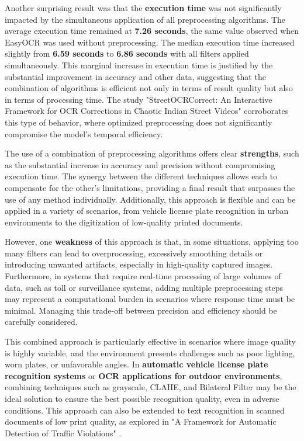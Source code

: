 \documentclass[conference]{IEEEtran}
\begin{document}
	Another surprising result was that the \textbf{execution time} was not significantly impacted by the simultaneous application of all preprocessing algorithms. The average execution time remained at \textbf{7.26 seconds}, the same value observed when EasyOCR was used without preprocessing. The median execution time increased slightly from \textbf{6.59 seconds} to \textbf{6.86 seconds} with all filters applied simultaneously. This marginal increase in execution time is justified by the substantial improvement in accuracy and other data, suggesting that the combination of algorithms is efficient not only in terms of result quality but also in terms of processing time. The study "StreetOCRCorrect: An Interactive Framework for OCR Corrections in Chaotic Indian Street Videos" \cite{b13} corroborates this type of behavior, where optimized preprocessing does not significantly compromise the model's temporal efficiency.
	
	The use of a combination of preprocessing algorithms offers clear \textbf{strengths}, such as the substantial increase in accuracy and precision without compromising execution time. The synergy between the different techniques allows each to compensate for the other's limitations, providing a final result that surpasses the use of any method individually. Additionally, this approach is flexible and can be applied in a variety of scenarios, from vehicle license plate recognition in urban environments to the digitization of low-quality printed documents.
	
	However, one \textbf{weakness} of this approach is that, in some situations, applying too many filters can lead to overprocessing, excessively smoothing details or introducing unwanted artifacts, especially in high-quality captured images. Furthermore, in systems that require real-time processing of large volumes of data, such as toll or surveillance systems, adding multiple preprocessing steps may represent a computational burden in scenarios where response time must be minimal. Managing this trade-off between precision and efficiency should be carefully considered.
	
	This combined approach is particularly effective in scenarios where image quality is highly variable, and the environment presents challenges such as poor lighting, worn plates, or unfavorable angles. In \textbf{automatic vehicle license plate recognition systems} or \textbf{OCR applications for outdoor environments}, combining techniques such as grayscale, CLAHE, and Bilateral Filter may be the ideal solution to ensure the best possible recognition quality, even in adverse conditions. This approach can also be extended to text recognition in scanned documents of low print quality, as explored in "A Framework for Automatic Detection of Traffic Violations" \cite{b12}.
	
\end{document}
